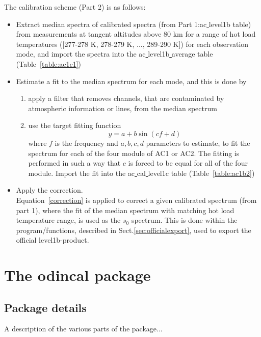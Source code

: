 \documentclass[12pt]{article}
\begin{document}
The calibration scheme (Part 2) is as follows:
\begin{itemize}
\item Extract median spectra of calibrated spectra 
(from Part 1:ac\underline{ }level1b table) 
from measurements at tangent altitudes above 80 km for a range of hot load 
temperatures ([277-278 K, 278-279 K, ..., 289-290 K]) 
for each observation mode, and import the spectra
into the ac\underline{ }level1b\underline{ }average table
(Table~\ref{table:ac1c1})
\item Estimate a fit to the median spectrum for each mode, and this is done
by
\begin{enumerate}
\item apply a filter that removes channels, that are contaminated by 
atmospheric information or lines, from the median spectrum 
\item use the target fitting function  
\begin{equation}
y=a+ b\sin(cf+d)
\end{equation}
where \(f\) is the frequency and \(a,b,c,d\) parameters to estimate,
to fit the spectrum for each of the four module of AC1 or AC2.
The fitting is performed in such a way that \(c\) is forced 
to be equal for all of the four module. 
Import the fit into the ac\underline{ }cal\underline{ }level1c
table (Table~\ref{table:ac1b2})
\end{enumerate}
\item Apply the correction.\\
Equation~\ref{correction} is applied to correct a given calibrated 
spectrum (from part 1), where the fit of the median spectrum
with matching hot load temperature range, is used as the \(s_{0}\)
spectrum. 
This is done within the program/functions, described in
Sect.\ref{sec:officialexport}, used to export the official
level1b-product.  
\end{itemize}

      
  



 



\section{The odincal package}
\subsection{Package details}
A description of the various parts of the package...
\end{document}
